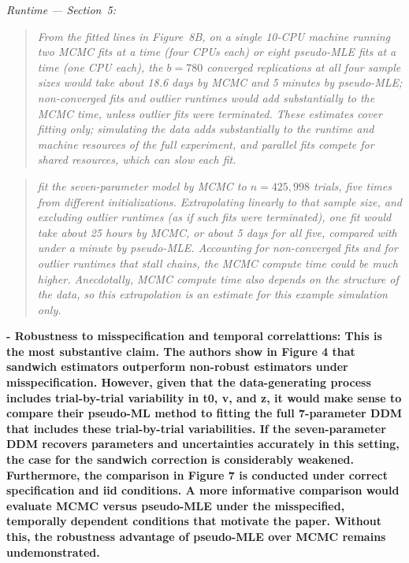 \documentclass[00-main.tex]{subfiles}
\newcommand{\reviewercomment}[1]{\vspace{0.3cm}\textbf{#1}\vspace{0.15cm}}
\newcommand{\manuscriptquote}[1]{\begin{quote}\textit{#1}\end{quote}}
\begin{document}
\emph{Runtime --- Section~5:}

\manuscriptquote{From the fitted lines in Figure~8B, on a single 10-CPU machine running two MCMC fits at a time (four CPUs each) or eight pseudo-MLE fits at a time (one CPU each), the $b=780$ converged replications at all four sample sizes would take about 18.6 days by MCMC and 5 minutes by pseudo-MLE; non-converged fits and outlier runtimes would add substantially to the MCMC time, unless outlier fits were terminated. These estimates cover fitting only; simulating the data adds substantially to the runtime and machine resources of the full experiment, and parallel fits compete for shared resources, which can slow each fit.}

\manuscriptquote{\citet{nguyen_different_2022} fit the seven-parameter model by MCMC to $n=425{,}998$ trials, five times from different initializations. Extrapolating linearly to that sample size, and excluding outlier runtimes (as if such fits were terminated), one fit would take about 25 hours by MCMC, or about 5 days for all five, compared with under a minute by pseudo-MLE. Accounting for non-converged fits and for outlier runtimes that stall chains, the MCMC compute time could be much higher. Anecdotally, MCMC compute time also depends on the structure of the data, so this extrapolation is an estimate for this example simulation only.}

\reviewercomment{- Robustness to misspecification and temporal correlattions: This is the most substantive claim. The authors show in Figure 4 that sandwich estimators outperform non-robust estimators under misspecification. However, given that the data-generating process includes trial-by-trial variability in t0, v, and z, it would make sense to compare their pseudo-ML method to fitting the full 7-parameter DDM that includes these trial-by-trial variabilities. If the seven-parameter DDM recovers parameters and uncertainties accurately in this setting, the case for the sandwich correction is considerably weakened. Furthermore, the comparison in Figure 7 is conducted under correct specification and iid conditions. A more informative comparison would evaluate MCMC versus pseudo-MLE under the misspecified, temporally dependent conditions that motivate the paper. Without this, the robustness advantage of pseudo-MLE over MCMC remains undemonstrated.}
\end{document}
